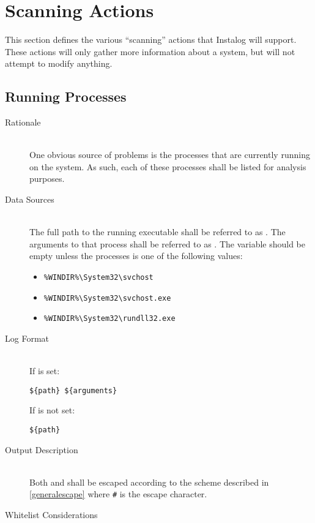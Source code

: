 \section{Scanning Actions} \label{sec:scanning_actions}
This section defines the various ``scanning'' actions that Instalog will
support.  These actions will only gather more information about a system, but
will not attempt to modify anything.

\subsection{Running Processes}
\begin{description}
\item[Rationale] \hfill \\
One obvious source of problems is the processes that are currently running on
the system.  As such, each of these processes shall be listed for analysis
purposes.  
\item[Data Sources] \hfill \\
The full path to the running executable shall be referred to as .  The
arguments to that process shall be referred to as .  The
 variable should be empty unless the processes is one of the
following values:
\begin{itemize}
  \item \verb|%WINDIR%\System32\svchost|
  \item \verb|%WINDIR%\System32\svchost.exe|
  \item \verb|%WINDIR%\System32\rundll32.exe|
\end{itemize}
\item[Log Format] \hfill \\
If  is set:
\vspace{-\baselineskip}
\begin{verbatim}
${path} ${arguments}
\end{verbatim}
If  is not set:
\vspace{-\baselineskip}
\begin{verbatim}
${path} 
\end{verbatim}
\item[Output Description] \hfill \\
Both  and  shall be escaped according to the scheme
described in \ref{generalescape} where \verb|#| is the escape character.
\item[Whitelist Considerations] \hfill \\

\end{description}
